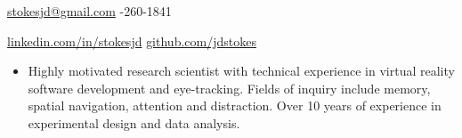 \documentclass[line,margin,10pt]{res}
\begin{document}

\begin{resume}
\hoffset\centerline 
{\hyperref[stokesjd@gmail.com]{stokesjd@gmail.com} \quad \quad \quad \quad  \quad \quad \quad \quad \quad \quad \quad \quad \quad \quad \quad \quad \quad \quad \quad \quad\quad \quad \quad \quad \quad \quad \quad \quad \quad \quad \quad  \quad \quad \quad \quad {}-260-1841}
\hoffset\centerline 
{\hspace{0.00cm} \hyperref[linkedin.com/in/stokesjd]{linkedin.com/in/stokesjd} \quad \quad \quad \quad \quad \quad \quad \quad \quad \quad \quad\quad \quad \quad \quad  \quad \quad \quad \quad \quad \quad \quad \quad \quad  \quad \quad \quad  \quad \quad \quad   \quad \hyperref[github.com/jdstokes]{github.com/jdstokes}}


\begin{itemize} \itemsep -2pt
\item  []{Highly motivated research scientist with technical experience in virtual reality software development and eye-tracking. Fields of inquiry include memory, spatial navigation, attention and distraction. Over 10 years of
experience in experimental design and data analysis.}\\


\end{itemize}


\end{resume}
\end{document}
